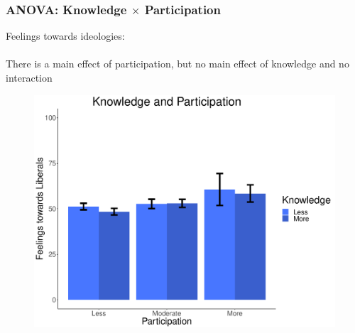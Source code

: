 \documentclass[14pt]{beamer}
\begin{document}
\begin{frame}
\frametitle{ANOVA: Knowledge $\times$ Participation}
\begin{center}
Feelings towards ideologies:
~~\\
~~\\
There is a main effect of participation, but no main effect of knowledge and no interaction
\end{center}
\end{frame}

\begin{frame}
\begin{center}
\begin{figure}[ht!]  
	{	 \includegraphics[width=.9\textwidth]{KPLib}}
\end{figure}
\end{center}
\end{frame}



\end{document}
